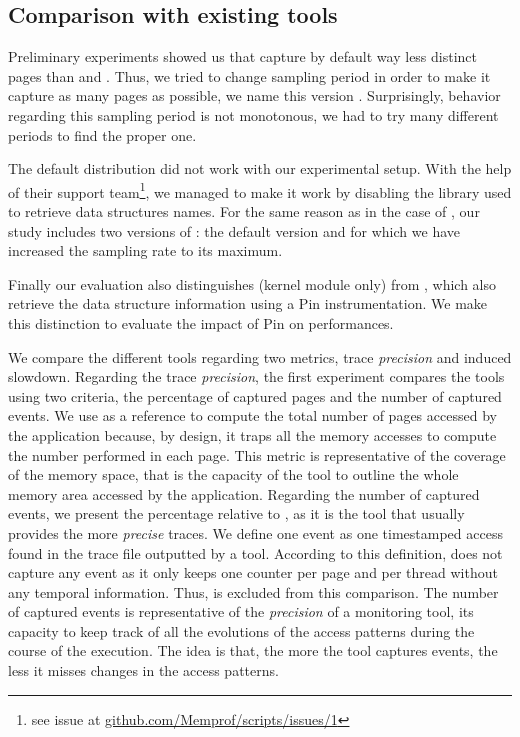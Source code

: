 
\subsection{Comparison with existing tools}
\label{sec:expe-ovh}

Preliminary experiments showed us that \Mitos capture by
default way less distinct pages than \TABARNAC and \Moca. Thus, we tried to change \Mitos
sampling period in order to make it capture as many pages as possible, 
we name this version \MitosTun. Surprisingly, \Mitos behavior regarding this sampling period
is not monotonous, we had to try many different periods to find the proper one.

The default \MemProf distribution did not work with our experimental setup. With the help
of their support team\footnote{see issue at
    \href{https://github.com/Memprof/scripts/issues/1}{github.com/Memprof/scripts/issues/1}}, we managed to make it work by disabling the library used to retrieve
data structures names. For the same reason as in the case of \Mitos, our study includes
two versions of \MemProf: the default version and \MemProfTun for which we have
increased the sampling rate to its maximum.

Finally our evaluation also distinguishes \Moca (kernel module only) from
\MocaPin, which also retrieve the data structure information using a Pin
instrumentation. We make this distinction to evaluate the impact of Pin on
\Moca performances.

We compare the different tools regarding two metrics, trace \emph{precision} and induced slowdown. Regarding the trace \emph{precision}, the first experiment compares the tools
using two criteria, the
percentage of captured pages and the number of captured events.  We use \TABARNAC as a reference to compute the total number of pages accessed by the
application because, by design, it traps all the memory accesses to compute the number performed in each page. This metric is representative of the coverage of the
memory space, that is the capacity of the tool to outline the whole memory area accessed by the application. Regarding the number of captured events, we present the percentage
relative to \Moca, as it is the tool that usually provides the more \emph{precise} traces. We define one event as one
timestamped access found in the trace file outputted by a tool. According to this definition, \TABARNAC does not capture any event as it only keeps one
counter per page and per thread without any temporal information. Thus, \TABARNAC is excluded from this comparison. The number of captured events is representative
of the \emph{precision} of a monitoring tool, its capacity to keep track of all the evolutions of the access patterns during the course of the execution. The idea is
that, the more the tool captures events, the less it misses changes in the access patterns.

